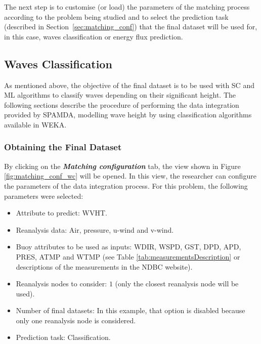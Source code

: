\documentclass[energies,article,accept,moreauthors,pdftex]{Definitions/mdpi}
\begin{document}
\begin{paracol}{2}
\switchcolumn

			
			
			The next step is to customise (or load) the parameters of the matching process according to the problem being studied and to select the prediction task (described in \mbox{Section \ref{sec:matching_conf}}) that the final dataset will be used for, in this case, waves classification or energy flux prediction.
			
			\subsection{Waves Classification}
			
			As mentioned above, the objective of the final dataset is to be used with SC and ML algorithms to classify waves depending on their significant height. The following sections describe the procedure of performing the data integration provided by SPAMDA, modelling wave height by using classification algorithms available in WEKA.
			
			\subsubsection{Obtaining the Final Dataset}
			
			By clicking on the \textbf{\textit{Matching configuration}} tab, the view shown in Figure \ref{fig:matching_conf_wc} will be opened. In this view, the researcher can configure the parameters of the data integration process. For this problem, the following parameters were selected:
			\begin{itemize}
				\item Attribute to predict: WVHT.
				\item Reanalysis data: Air, pressure, u-wind and v-wind.
				\item Buoy attributes to be used as inputs: WDIR, WSPD, GST, DPD, APD, PRES, ATMP and WTMP (see Table \ref{tab:measurementsDescription} or descriptions of the measurements in the NDBC website).
				\item Reanalysis nodes to consider: $1$ (only the closest reanalysis node will be used).
				\item Number of final datasets: In this example, that option is disabled because only one reanalysis node is considered.
				\item Prediction task: Classification.
			\end{itemize} 
			

\end{paracol}
\end{document}
